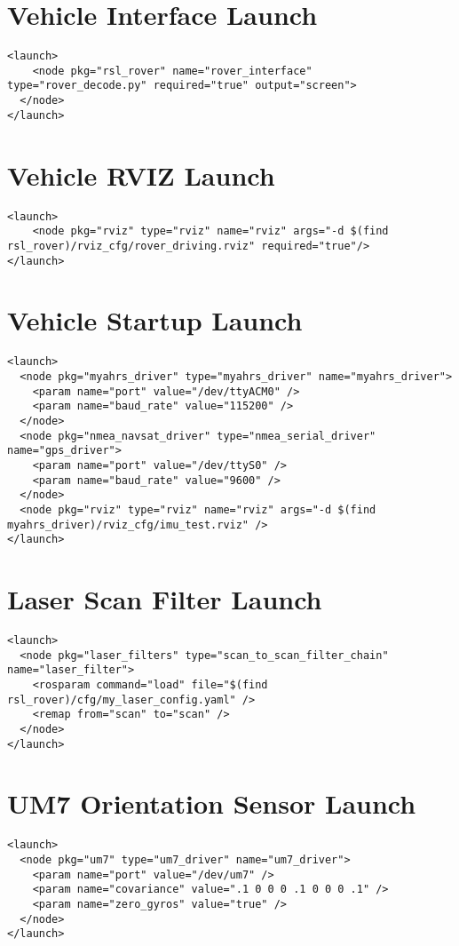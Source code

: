 \section{Vehicle Interface Launch}
\begin{verbatim}
<launch>
	<node pkg="rsl_rover" name="rover_interface" type="rover_decode.py" required="true" output="screen">
  </node>
</launch>
\end{verbatim}


\section{Vehicle RVIZ Launch}
\begin{verbatim}
<launch>
	<node pkg="rviz" type="rviz" name="rviz" args="-d $(find rsl_rover)/rviz_cfg/rover_driving.rviz" required="true"/>
</launch>
\end{verbatim}


\section{Vehicle Startup Launch}
\begin{verbatim}
<launch>
  <node pkg="myahrs_driver" type="myahrs_driver" name="myahrs_driver">
    <param name="port" value="/dev/ttyACM0" />
    <param name="baud_rate" value="115200" />
  </node>
  <node pkg="nmea_navsat_driver" type="nmea_serial_driver" name="gps_driver">
    <param name="port" value="/dev/ttyS0" />
    <param name="baud_rate" value="9600" />
  </node>
  <node pkg="rviz" type="rviz" name="rviz" args="-d $(find myahrs_driver)/rviz_cfg/imu_test.rviz" />
</launch>

\end{verbatim}



\section{Laser Scan Filter Launch}
\begin{verbatim}
<launch>
  <node pkg="laser_filters" type="scan_to_scan_filter_chain"  name="laser_filter">
    <rosparam command="load" file="$(find rsl_rover)/cfg/my_laser_config.yaml" />
    <remap from="scan" to="scan" />
  </node>
</launch>
\end{verbatim}

\section{UM7 Orientation Sensor Launch}
\begin{verbatim}
<launch>
  <node pkg="um7" type="um7_driver" name="um7_driver">
    <param name="port" value="/dev/um7" />
    <param name="covariance" value=".1 0 0 0 .1 0 0 0 .1" />
    <param name="zero_gyros" value="true" />
  </node>
</launch>
\end{verbatim}



